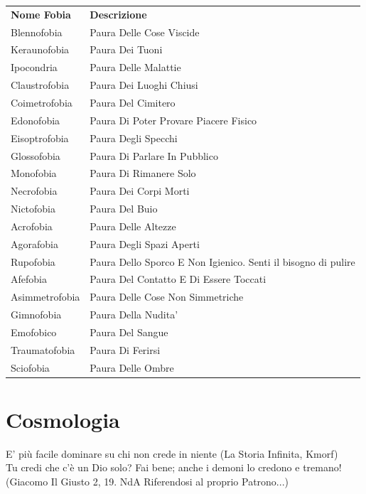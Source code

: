 \documentclass[a4paper,11pt,twoside,openany]{book}
\begin{document}
\begin{tabularx}{0.95\textwidth}{lX}
	\toprule
	\textbf{Nome Fobia} & \textbf{Descrizione}\\
	Blennofobia         & Paura Delle Cose Viscide\\
	Keraunofobia        & Paura Dei Tuoni\\
	Ipocondria          & Paura Delle Malattie\\
	Claustrofobia       & Paura Dei Luoghi Chiusi\\
	Coimetrofobia       & Paura Del Cimitero\\
	Edonofobia          & Paura Di Poter Provare Piacere Fisico\\
	Eisoptrofobia       & Paura Degli Specchi\\
	Glossofobia         & Paura Di Parlare In Pubblico\\
	Monofobia           & Paura Di Rimanere Solo\\
	Necrofobia          & Paura Dei Corpi Morti\\
	Nictofobia          & Paura Del Buio\\
	Acrofobia           & Paura Delle Altezze\\
	Agorafobia          & Paura Degli Spazi Aperti\\
	Rupofobia           & Paura Dello Sporco E Non Igienico. Senti il bisogno di pulire\\
	Afefobia            & Paura Del Contatto E Di Essere Toccati\\
	Asimmetrofobia      & Paura Delle Cose Non Simmetriche\\
	Gimnofobia          & Paura Della Nudita'\\
	Emofobico           & Paura Del Sangue\\
	Traumatofobia       & Paura Di Ferirsi\\
	Sciofobia           & Paura Delle Ombre\\
\end{tabularx}

\pagebreak

\section{Cosmologia}

\label{cosmologia}
\begin{tcolorbox}[enhanced,arc=5pt,boxrule=0.3pt]{
E' più facile dominare su chi non crede in niente (La Storia Infinita, Kmorf)\\
Tu credi che c'è un Dio solo? Fai bene; anche i demoni lo credono e tremano! (Giacomo Il Giusto 2, 19. NdA Riferendosi al proprio Patrono...)}\end{tcolorbox}\medskip
\end{document}
